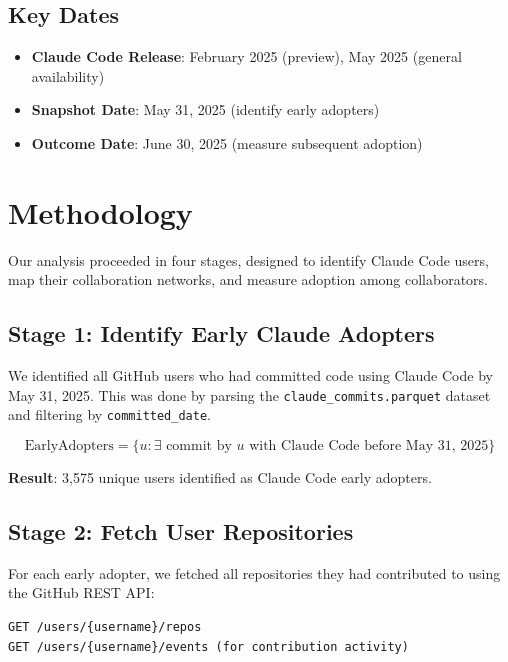 \documentclass[11pt]{article}
\begin{document}
\subsection{Key Dates}

\begin{itemize}
    \item \textbf{Claude Code Release}: February 2025 (preview), May 2025 (general availability)
    \item \textbf{Snapshot Date}: May 31, 2025 (identify early adopters)
    \item \textbf{Outcome Date}: June 30, 2025 (measure subsequent adoption)
\end{itemize}

\section{Methodology}

Our analysis proceeded in four stages, designed to identify Claude Code users, map their collaboration networks, and measure adoption among collaborators.

\subsection{Stage 1: Identify Early Claude Adopters}

We identified all GitHub users who had committed code using Claude Code by May 31, 2025. This was done by parsing the \texttt{claude\_commits.parquet} dataset and filtering by \texttt{committed\_date}.

\begin{equation}
\text{EarlyAdopters} = \{u : \exists \text{ commit by } u \text{ with Claude Code before May 31, 2025}\}
\end{equation}

\textbf{Result}: 3,575 unique users identified as Claude Code early adopters.

\subsection{Stage 2: Fetch User Repositories}

For each early adopter, we fetched all repositories they had contributed to using the GitHub REST API:

\begin{verbatim}
GET /users/{username}/repos
GET /users/{username}/events (for contribution activity)
\end{verbatim}
\end{document}

